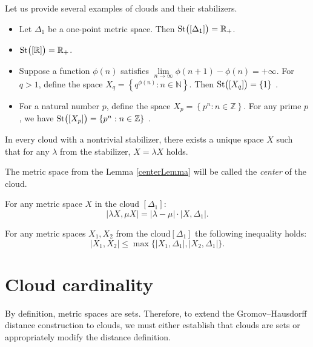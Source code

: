 \documentclass[leqno]{article}
\begin{document}
Let us provide several examples of clouds and their stabilizers.

\begin{itemize}
    \item Let $\Delta_1$ be a one-point metric space. Then
        $\operatorname{St}\bigl([\Delta_1]\bigr) = \mathbb{R}_+$.
    \item $\operatorname{St}\bigl([\mathbb{R}]\bigr) = \mathbb{R}_+$.
    \item Suppose a function $\phi(n)$ satisfies $\lim\limits_{n
        \rightarrow \infty} \phi(n + 1) - \phi(n) = +\infty$. For $q >
        1$, define the space $X_q = \left\{q^{\phi(n)}: n \in
        \mathbb{N}\right\}$. Then $\operatorname{St}\bigl([X_q]\bigr) = \{1\}$
        \cite{TuzhBog1}.
    \item For a natural number $p$, define the space $X_p = \left\{p^n
        : n \in \mathbb{Z}\right\}$. For any prime $p$, we have
        $\operatorname{St}\bigl([X_p]\bigr) = \left\{p^n : n \in \mathbb{Z}\right\}$
        \cite{BogBog1}.
\end{itemize}

\begin{lemma}
    In every cloud with a nontrivial stabilizer, there exists a unique
    space $X$ such that for any $\lambda$ from the stabilizer, $X =
    \lambda X$ holds.
    \label{centerLemma}
\end{lemma}

\begin{definition}
    The metric space from the Lemma \ref{centerLemma} will be called
    the \emph{center} of the cloud.
\end{definition}
\begin{remark} For any metric space $X$ in the cloud $[\Delta_1]$:
    $$|\lambda X, \mu X| = |\lambda - \mu|\cdot|X,\Delta_1|.$$
\end{remark}
\begin{remark} For any metric spaces $X_{1},
    X_{2}$ from the cloud$[\Delta_{1}]$ the following inequality holds:
    $$|X_{1},X_{2}| \le \max\{|X_{1}, \Delta_{1}|,|X_{2},\Delta_{1}|\}.$$
    \label{remUltraMetric}
\end{remark}
\section{Cloud cardinality}

By definition, metric spaces are sets. Therefore, to extend the
Gromov--Hausdorff distance construction to clouds, we must either
establish that clouds are sets or appropriately modify the distance definition.
\end{document}
